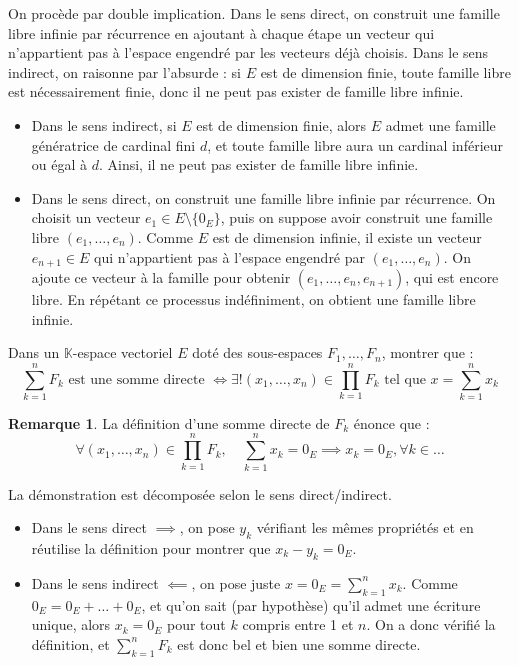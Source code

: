 \documentclass[11pt, a4paper]{article}
\theoremstyle{definition}
\newtheorem*{remarque}{Remarque}
\begin{document}
\begin{tcolorbox}[methodstyle]
	On procède par double implication. Dans le sens direct, on construit une famille libre infinie par récurrence en ajoutant à chaque étape un vecteur qui n'appartient pas à l'espace engendré par les vecteurs déjà choisis. Dans le sens indirect, on raisonne par l'absurde : si $E$ est de dimension finie, toute famille libre est nécessairement finie, donc il ne peut pas exister de famille libre infinie.
\end{tcolorbox}

\begin{itemize}
	\item[$\impliedby$] Dans le sens indirect, si $E$ est de dimension finie, alors $E$ admet une famille génératrice de cardinal fini $d$, et toute famille libre aura un cardinal inférieur ou égal à $d$. Ainsi, il ne peut pas exister de famille libre infinie.
	\item[$\implies$] Dans le sens direct, on construit une famille libre infinie par récurrence. On choisit un vecteur $e_1 \in E \setminus \{0_E\}$, puis on suppose avoir construit une famille libre $(e_1, \dots, e_n)$. Comme $E$ est de dimension infinie, il existe un vecteur $e_{n+1} \in E$ qui n'appartient pas à l'espace engendré par $(e_1, \dots, e_n)$. On ajoute ce vecteur à la famille pour obtenir $(e_1, \dots, e_n, e_{n+1})$, qui est encore libre. En répétant ce processus indéfiniment, on obtient une famille libre infinie.
\end{itemize}

\clearpage

\begin{tcolorbox}[instructionstyle]

Dans un $\mathbb K$-espace vectoriel $E$ doté des sous-espaces $F_1,\dots,F_n$, montrer que :
\[
\sum_{k=1}^n F_k \text{ est une somme directe } \iff \exists ! (x_1,\dots,x_n) \in \prod_{k=1}^n F_k \text{ tel que } x = \sum_{k=1}^n x_k
\]
\end{tcolorbox}

\begin{remarque}
La définition d'une somme directe de $F_k$ énonce que :
\[
\forall (x_1,\dots,x_n) \in \prod_{k=1}^n F_k, \quad \sum_{k=1}^n x_k = 0_E \implies x_k = 0_E, \forall k \in \dots
\]
\end{remarque}

La démonstration est décomposée selon le sens direct/indirect.
\begin{itemize}
\item Dans le sens direct $\implies$, on pose $y_k$ vérifiant les mêmes propriétés et en réutilise la définition pour montrer que $x_k - y_k = 0_E$.
\item Dans le sens indirect $\impliedby$, on pose juste $x = 0_E = \sum_{k=1}^n x_k$. Comme $0_E = 0_E + \dots + 0_E$, et qu'on sait (par hypothèse) qu'il admet une écriture unique, alors $x_k = 0_E$ pour tout $k$ compris entre 1 et $n$. On a donc vérifié la définition, et $\sum_{k=1}^n F_k$ est donc bel et bien une somme directe.
\end{itemize}
\end{document}
